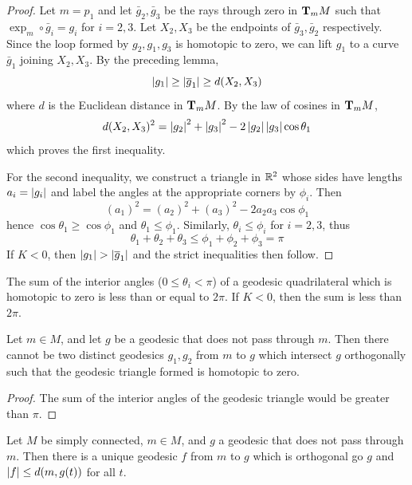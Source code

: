 \documentclass[../main]{subfiles}
\begin{document}
\begin{proof}
Let $m=p_1$ and let $\bar g_2,\bar g_3$ be the rays through zero in $\ts Mm$ such that $\exp_m\circ\bar g_i=g_i$ for $i=2,3$. Let $X_2,X_3$ be the endpoints of $\bar g_3,\bar g_2$ respectively. Since the loop formed by $g_2,g_1,g_3$ is homotopic to zero, we can lift $g_1$ to a curve $\bar g_1$ joining $X_2,X_3$. By the preceding lemma,
\[\norm{g_1} \ge \norm{\bar g_1} \ge d(X_2,X_3)\]
where $d$ is the Euclidean distance in $\ts Mm$. By the law of cosines in $\ts Mm$,
\[d(X_2,X_3)^2 = \norm{g_2}^2 + \norm{g_3}^2 - 2\norm{g_2}\norm{g_3}\cos\theta_1\]
which proves the first inequality.

For the second inequality, we construct a triangle in $\bR^2$ whose sides have lengths $a_i=\norm{g_i}$ and label the angles at the appropriate corners by $\phi_i$. Then
\[(a_1)^2 = (a_2)^2 + (a_3)^2 - 2a_2a_3\cos\phi_1\]
hence $\cos\theta_1\ge\cos\phi_1$ and $\theta_1\le\phi_1$. Similarly, $\theta_i\le\phi_i$ for $i=2,3$, thus
\[\theta_1+\theta_2+\theta_3 \le \phi_1+\phi_2+\phi_3 = \pi\]
If $K<0$, then $\norm{g_1}>\norm{\bar g_1}$ and the strict inequalities then follow.
\end{proof}



\begin{corollary} \label{cor:ch10.8.3}
The sum of the interior angles ($0\le\theta_i<\pi$) of a geodesic quadrilateral which is homotopic to zero is less than or equal to $2\pi$. If $K<0$, then the sum is less than $2\pi$.
\end{corollary}



\begin{corollary} \label{cor:ch10.8.4}
Let $m\in M$, and let $g$ be a geodesic that does not pass through $m$. Then there cannot be two distinct geodesics $g_1,g_2$ from $m$ to $g$ which intersect $g$ orthogonally such that the geodesic triangle formed is homotopic to zero.
\end{corollary}

\begin{proof}
The sum of the interior angles of the geodesic triangle would be greater than $\pi$.
\end{proof}



\begin{corollary}\label{cor:ch10.8.5}
Let $M$ be simply connected, $m\in M$, and $g$ a geodesic that does not pass through $m$. Then there is a unique geodesic $f$ from $m$ to $g$ which is orthogonal go $g$ and $\norm f\le d(m,g(t))$ for all $t$.
\end{corollary}
\end{document}
